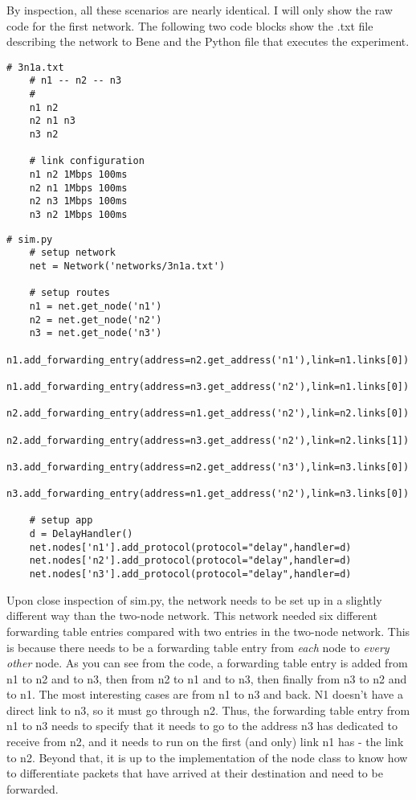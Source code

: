 \documentclass[11pt]{article}
\begin{document}
By inspection, all these scenarios are nearly identical. I will only show the raw code for the first network. The following two code blocks show the .txt file describing the network to Bene and the Python file that executes the experiment.

\vspace{5mm}
\begin{absolutelynopagebreak}
\begin{lstlisting}
# 3n1a.txt
    # n1 -- n2 -- n3
    #
    n1 n2
    n2 n1 n3
    n3 n2

    # link configuration
    n1 n2 1Mbps 100ms
    n2 n1 1Mbps 100ms
    n2 n3 1Mbps 100ms
    n3 n2 1Mbps 100ms
\end{lstlisting}
\end{absolutelynopagebreak}

\vspace{5mm}

\begin{absolutelynopagebreak}
\begin{lstlisting}
# sim.py
    # setup network
    net = Network('networks/3n1a.txt')

    # setup routes
    n1 = net.get_node('n1')
    n2 = net.get_node('n2')
    n3 = net.get_node('n3')
    n1.add_forwarding_entry(address=n2.get_address('n1'),link=n1.links[0])
    n1.add_forwarding_entry(address=n3.get_address('n2'),link=n1.links[0])
    n2.add_forwarding_entry(address=n1.get_address('n2'),link=n2.links[0])
    n2.add_forwarding_entry(address=n3.get_address('n2'),link=n2.links[1])
    n3.add_forwarding_entry(address=n2.get_address('n3'),link=n3.links[0])
    n3.add_forwarding_entry(address=n1.get_address('n2'),link=n3.links[0])

    # setup app
    d = DelayHandler()
    net.nodes['n1'].add_protocol(protocol="delay",handler=d)
    net.nodes['n2'].add_protocol(protocol="delay",handler=d)
    net.nodes['n3'].add_protocol(protocol="delay",handler=d)
\end{lstlisting}
\end{absolutelynopagebreak}
\vspace{5mm}

Upon close inspection of sim.py, the network needs to be set up in a slightly different way than the two-node network. This network needed six different forwarding table entries compared with two entries in the two-node network. This is because there needs to be a forwarding table entry from \emph{each} node to \emph{every other} node. As you can see from the code, a forwarding table entry is added from n1 to n2 and to n3, then from n2 to n1 and to n3, then finally from n3 to n2 and to n1. The most interesting cases are from n1 to n3 and back. N1 doesn't have a direct link to n3, so it must go through n2. Thus, the forwarding table entry from n1 to n3 needs to specify that it needs to go to the address n3 has dedicated to receive from n2, and it needs to run on the first (and only) link n1 has - the link to n2. Beyond that, it is up to the implementation of the node class to know how to differentiate packets that have arrived at their destination and need to be forwarded.
\end{document}
